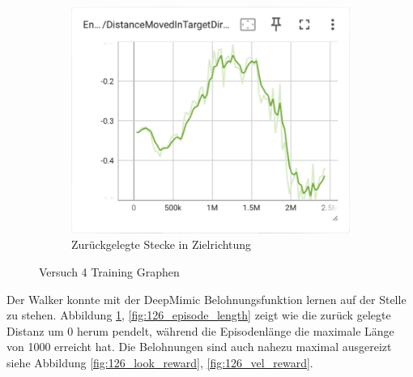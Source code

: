 \begin{figure}[H]
    \begin{subfigure}{.49\textwidth}
      \centering  
      \includegraphics[width=\textwidth]{img/126_move_target_dir}
      \caption{Zurückgelegte Stecke in Zielrichtung}
      \label{fig:126_move_target_dir}
    \end{subfigure}
  \caption{Versuch 4 Training Graphen}
  \label{fig:versuch4_training}
\end{figure}

Der Walker konnte mit der DeepMimic Belohnungsfunktion lernen auf der Stelle zu stehen.  Abbildung \ref{fig:126_move_target_dir}, \ref{fig:126_episode_length} zeigt wie die zurück gelegte Distanz um 0 herum pendelt, während die Episodenlänge die maximale Länge von 1000 erreicht hat. Die Belohnungen sind auch nahezu maximal ausgereizt siehe Abbildung \ref{fig:126_look_reward}, \ref{fig:126_vel_reward}.

